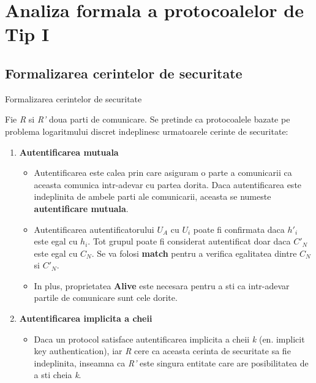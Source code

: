 \documentclass[11pt]{beamer}
\begin{document}
\section{Analiza formala a protocoalelor de Tip I}

\subsection{Formalizarea cerintelor de securitate}

\begin{frame}[t,allowframebreaks]{Formalizarea cerintelor de securitate}

Fie \textit{R} si \textit{R'} doua parti de comunicare. Se pretinde ca protocoalele bazate pe problema logaritmului discret indeplinesc urmatoarele cerinte de securitate:

\begin{enumerate}

\item \textbf{Autentificarea mutuala}

	\begin{itemize}

	\item Autentificarea este calea prin care asiguram o parte a comunicarii ca aceasta comunica intr-adevar cu partea dorita. Daca autentificarea este indeplinita de ambele parti ale comunicarii, aceasta se numeste \textbf{autentificare mutuala}.
	\item Autentificarea autentificatorului $U_A$ cu $U_i$ poate fi confirmata daca $h'_i$ este egal cu $h_i$. Tot grupul poate fi considerat autentificat doar daca $C'_N$ este egal cu $C_N$. Se va folosi \textbf{match} pentru a verifica egalitatea dintre $C_N$ si $C'_N$.
	\item In plus, proprietatea \textbf{Alive} este necesara pentru a sti ca intr-adevar partile de comunicare sunt cele dorite. 

	\end{itemize}
	
\item \textbf{Autentificarea implicita a cheii}

	\begin{itemize}
	
	\item Daca un protocol satisface autentificarea implicita a cheii \textit{k} (en. implicit key authentication), iar \textit{R} cere ca aceasta cerinta de securitate sa fie indeplinita, inseamna ca \textit{R'} este singura entitate care are posibilitatea de a sti cheia \textit{k}.
	

\end{itemize}
\end{enumerate}
\end{frame}
\end{document}
